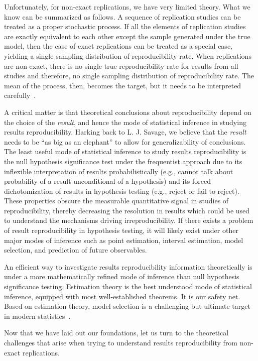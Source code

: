\documentclass[meta,authordate,issue]{jote-new-article}
\newcounter{result}
\begin{document}
Unfortunately, for non-exact replications, we have very limited theory. What we know  can be summarized as follows. A sequence of replication studies can be treated as a proper stochastic process. If all the elements of replication studies are exactly equivalent to each other except the sample generated under the true model, then the case of exact replications can be treated as a special case, yielding a single sampling distribution of reproducibility rate. When replications are non-exact, there is no single true reproducibility rate for results from all studies and therefore, no single sampling distribution of reproducibility rate. The mean of the process, then, becomes the target, but it needs to be interpreted carefully~\parencite[see][for more information]{Buzbas2023}.

A critical matter is that theoretical conclusions about reproducibility depend on the choice of the {\em result}, and hence the mode of statistical inference in studying results reproducibility. Harking back to L. J. Savage, we believe that the {\em result} needs to be ``as big as an elephant'' to allow for generalizability of conclusions. The least useful mode of statistical inference to study results reproducibility is the null hypothesis significance test under the frequentist approach due to its inflexible interpretation of results probabilistically (e.g., cannot talk about probability of a result unconditional of a hypothesis) and its forced dichotomization of results in hypothesis testing (e.g., reject or fail to reject). These properties obscure the measurable quantitative signal in studies of reproducibility, thereby decreasing the resolution in results which could be used to understand the mechanisms driving irreproducibility. If there exists a problem of result reproducibility in hypothesis testing, it will likely exist under other major modes of inference such as point estimation, interval estimation, model selection, and prediction of future observables.

An efficient way to investigate results reproducibility information theoretically is under a more mathematically refined mode of inference than null hypothesis significance testing. Estimation theory is the best understood mode of statistical inference, equipped with most well-established theorems. It is our safety net. Based on estimation theory, model selection is a challenging but ultimate target in modern statistics~\parencite[as well as in][]{Devezer2019}.

Now that we have laid out our foundations, let us turn to the theoretical challenges that arise when trying to understand results reproducibility from non-exact replications.
\end{document}
